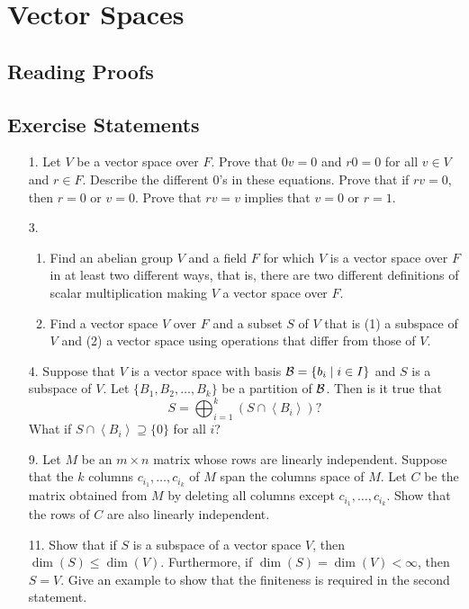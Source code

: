 \chapter{Vector Spaces}
\section{Reading Proofs}


\section{Exercise Statements}
\begin{enumerate}
\item[1.] Let $V$ be a vector space over $F$. Prove that $0v=0$ and $r0=0$ for all $v\in V$ and $r\in F$. Describe the different 0's in these equations. Prove that if $rv=0$, then $r=0$ or $v=0$. Prove that $rv=v$ implies that $v=0$ or $r=1$.

\item[3.] 
\begin{enumerate}[label=\alph*.]
	\item Find an abelian group $V$ and a field $F$ for which $V$ is a vector space over $F$ in at least two different ways, that is, there are two different definitions of scalar multiplication making $V$ a vector space over $F$.
	\item Find a vector space $V$ over $F$ and a subset $S$ of $V$ that is (1) a subspace of $V$ and (2) a vector space using operations that differ from those of $V$.
\end{enumerate}

\item[4.] Suppose that $V$ is a vector space with basis ${\mathcal{B}}=\{b_i\mid i\in I\}$ and $S$ is a subspace of $V$. Let $\{B_1,B_2,\ldots,B_k\}$ be a partition of ${\mathcal{B}}$. Then is it true that
\[S=\bigoplus_{i=1}^k (S\cap\left\langle B_i\right\rangle)?\]
What if $S\cap\left\langle B_i\right\rangle\supseteq\{0\}$ for all $i$?

\item[9.] Let $M$ be an $m\times n$ matrix whose rows are linearly independent. Suppose that the $k$ columns $c_{i_1},\ldots,c_{i_k}$ of $M$ span the columns space of $M$. Let $C$ be the matrix obtained from $M$ by deleting all columns except $c_{i_1},\ldots,c_{i_k}$. Show that the rows of $C$ are also linearly independent.

\item[11.] Show that if $S$ is a subspace of a vector space $V$, then $\dim(S)\leq\dim(V)$. Furthermore, if $\dim(S)=\dim(V)<\infty$, then $S=V$. Give an example to show that the finiteness is required in the second statement.


\end{enumerate}
